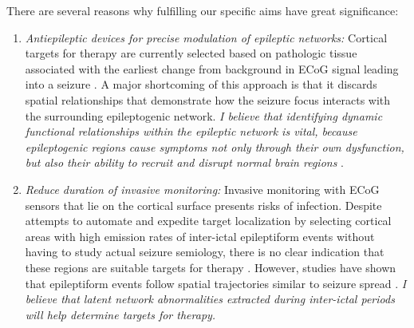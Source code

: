 There are several reasons why fulfilling our specific aims have great significance:
\begin{enumerate}
    \item \textit{Antiepileptic devices for precise modulation of epileptic networks:} Cortical targets for therapy are currently selected based on pathologic tissue associated with the earliest change from background in ECoG signal leading into a seizure \cite{litt2001epileptic}. A major shortcoming of this approach is that it discards spatial relationships that demonstrate how the seizure focus interacts with the surrounding epileptogenic network. \textit{I believe that identifying dynamic functional relationships within the epileptic network is vital, because epileptogenic regions cause symptoms not only through their own dysfunction, but also their ability to recruit and disrupt normal brain regions} \cite{kutsy1999ictal, spencer2002neural}.
    
    \item \textit{Reduce duration of invasive monitoring:} Invasive monitoring with ECoG sensors that lie on the cortical surface presents risks of infection. Despite attempts to automate and expedite target localization by selecting cortical areas with high emission rates of inter-ictal epileptiform events without having to study actual seizure semiology, there is no clear indication that these regions are suitable targets for therapy . However, studies have shown that epileptiform events follow spatial trajectories similar to seizure spread \cite{alarcon1997origin, lai2007cortical, wilke2009identification}. \textit{I believe that latent network abnormalities extracted during inter-ictal periods will help determine targets for therapy.}
\end{enumerate}
